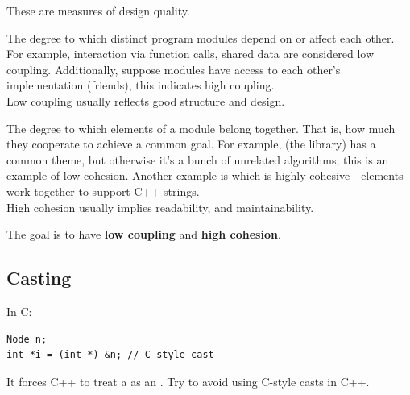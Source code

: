 \documentclass[english, 11pt]{article}
\begin{document}
These are measures of design quality.

\begin{defn}[coupling]\label{coupling}
  The degree to which distinct program modules depend on or affect each other. For example, interaction via function calls, shared data are considered low coupling. Additionally, suppose modules have access to each other's implementation (friends), this indicates high coupling. \\

  Low coupling usually reflects good structure and design.
\end{defn}

\begin{defn}[cohesion]\label{cohesion}
The degree to which elements of a module belong together. That is, how much they cooperate to achieve a common goal. For example,  (the library) has a common theme, but otherwise it's a bunch of unrelated algorithms; this is an example of low cohesion. Another example is  which is highly cohesive - elements work together to support C++ strings. \\

High cohesion usually implies readability, and maintainability.
\end{defn}

The goal is to have \textbf{low coupling} and \textbf{high cohesion}.

\subsection{Casting}

In C:
\begin{lstlisting}
Node n;
int *i = (int *) &n; // C-style cast
\end{lstlisting}
It forces C++ to treat a  as an . Try to avoid using C-style casts in C++. \\
\end{document}
